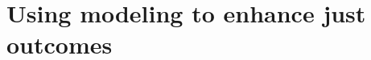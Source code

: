 










\chapter{Using modeling to enhance just outcomes}
\label{chapter:communities}
\iffalse


